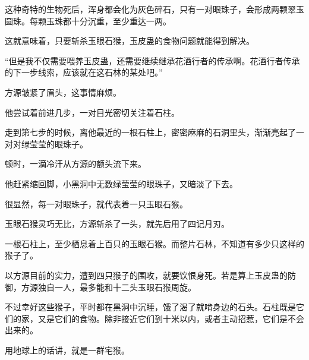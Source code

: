 \begin{this_body}
这种奇特的生物死后，浑身都会化为灰色碎石，只有一对眼珠子，会形成两颗翠玉圆珠。每颗玉珠都十分沉重，至少重达一两。

这就意味着，只要斩杀玉眼石猴，玉皮蛊的食物问题就能得到解决。

“但是我不仅需要喂养玉皮蛊，还需要继续继承花酒行者的传承啊。花酒行者传承的下一步线索，应该就在这石林的某处吧。”

方源皱紧了眉头，这事情麻烦。

他尝试着前进几步，一对目光密切关注着石柱。

走到第七步的时候，离他最近的一根石柱上，密密麻麻的石洞里头，渐渐亮起了一对对绿莹莹的眼珠子。

顿时，一滴冷汗从方源的额头流下来。

他赶紧缩回脚，小黑洞中无数绿莹莹的眼珠子，又暗淡了下去。

很显然，每一对眼珠子，就代表着一只玉眼石猴。

玉眼石猴灵巧无比，方源斩杀了一头，就先后用了四记月刃。

一根石柱上，至少栖息着上百只的玉眼石猴。而整片石林，不知道有多少只这样的猴子了。

以方源目前的实力，遭到四只猴子的围攻，就要饮恨身死。若是算上玉皮蛊的防御，方源独自一人，最多能和十二头玉眼石猴周旋。

不过幸好这些猴子，平时都在黑洞中沉睡，饿了渴了就啃身边的石头。石柱既是它们的家，又是它们的食物。除非接近它们到十米以内，或者主动招惹，它们是不会出来的。

用地球上的话讲，就是一群宅猴。

\end{this_body}

